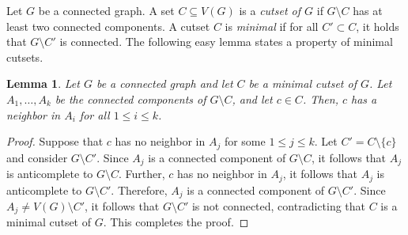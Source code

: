 \documentclass[12pt]{amsart}
\newtheorem{lemma}{Lemma}
\begin{document}
Let $G$ be a connected graph. A set $C \subseteq V(G)$ is a {\em cutset of $G$} if $G \setminus C$ has at least two connected components. A cutset $C$ is {\em minimal} if for all $C' \subset C$, it holds that $G \setminus C'$ is connected. The following easy lemma states a property of minimal cutsets.

\begin{lemma}
Let $G$ be a connected graph and let $C$ be a minimal cutset of $G$. Let $A_1, \hdots, A_k$ be the connected components of $G \setminus C$, and let $c \in C$. Then, $c$ has a neighbor in $A_i$ for all $1 \leq i \leq k$.
\end{lemma}
\begin{proof}
Suppose that $c$ has no neighbor in $A_j$ for some $1 \leq j \leq k$. Let $C' = C \setminus \{c\}$ and consider $G \setminus C'$.  Since $A_j$ is a connected component of $G \setminus C$, it follows that $A_j$ is anticomplete to $G \setminus C$. Further, $c$ has no neighbor in $A_j$, it follows that $A_j$ is anticomplete to $G \setminus C'$. Therefore, $A_j$ is a connected component of $G \setminus C'$. Since $A_j \neq V(G) \setminus C'$, it follows that $G \setminus C'$ is not connected, contradicting that $C$ is a minimal cutset of $G$. This completes the proof.
\end{proof}
\end{document}
